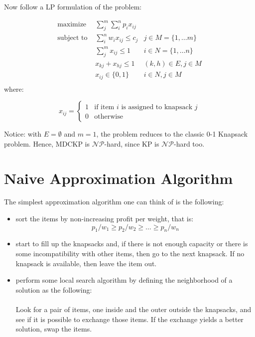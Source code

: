 \documentclass[]{article}
\begin{document}
Now follow a LP formulation of the problem:

\begin{align*}
\text{maximize }   & \sum_j^m \sum_i^n p_i x_{ij} 	&\\
\text{subject to } & \sum_i^n w_i x_{ij} \le c_j 	& j \in M = \{1, \dots m\}\\
				   & \sum_j^m x_{ij} \le 1 			& i \in N = \{1, \dots n\}\\
				   & x_{kj} + x_{hj} \le 1			& (k, h)\in E, j\in M\\
				   & x_{ij} \in \{0, 1\} 			& i \in N, j \in M\\
\end{align*}
where:

\begin{equation*}
x_{ij} = \begin{cases}
	1 & \text{if item $i$ is assigned to knapsack $j$} \\
	0 & \text{otherwise}
\end{cases}
\end{equation*}

Notice: with $E=\emptyset$ and $m=1$, the problem reduces to the classic 0-1 Knapsack problem. Hence, MDCKP is $\mathcal{NP}$-hard, since KP is $\mathcal{NP}$-hard too.

\section{Naive Approximation Algorithm}
The simplest approximation algorithm one can think of is the following:
\begin{itemize}
	\item sort the items by non-increasing profit per weight, that is:
	\begin{equation*}
		p_1/w_1 \ge p_2/w_2 \ge \dots \ge p_n/w_n
	\end{equation*}
	\item start to fill up the knapsacks and, if there is not enough capacity or there is some incompatibility with other items, then go to the next knapsack. If no knapsack is available, then leave the item out.
	\item perform some local search algorithm by defining the neighborhood of a solution as the following:
	
	\paragraph{} Look for a pair of items, one inside and the outer outside the knapsacks, and see if it is possible to exchange those items. If the exchange yields a better solution, swap the items.
	
\end{itemize}


\printbibliography
\end{document}
